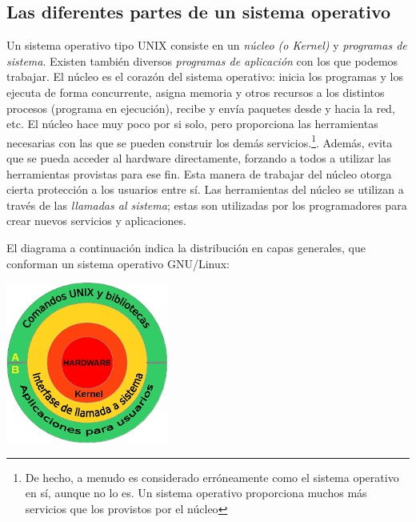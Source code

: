 \documentclass[12pt]{article}
\begin{document}
\subsection{Las diferentes partes de un sistema operativo}

Un sistema operativo tipo UNIX consiste en un \textit{núcleo (o Kernel)} 
y \textit{programas de sistema}. Existen también diversos 
\textit{programas de aplicación} con los que podemos trabajar.  El núcleo 
es el corazón del sistema operativo: inicia los programas y los ejecuta 
de forma concurrente, asigna memoria y otros recursos a los distintos 
procesos (programa en ejecución), recibe y envía paquetes desde y hacia 
la red, etc. El núcleo hace muy poco por si solo, pero proporciona las 
herramientas necesarias 
con las que se pueden construir los demás servicios.\footnote{De hecho, a 
menudo es considerado erróneamente como el sistema operativo en sí, 
aunque no lo es. Un sistema operativo proporciona muchos más
servicios que los provistos por el núcleo}.  
Además, evita que se pueda acceder al hardware directamente, forzando 
a todos a utilizar las herramientas provistas para ese fin. Esta
manera de trabajar del núcleo otorga cierta protección a los usuarios 
entre sí. Las herramientas del núcleo se utilizan a través de las 
\textit{llamadas al sistema}; estas son utilizadas por los programadores 
para crear nuevos servicios y aplicaciones.  

El diagrama a continuación indica la distribución en capas generales, 
que conforman un sistema operativo GNU/Linux: 

\begin{center}
\includegraphics{./img/esquemaOS_s.jpg}
\end{center}
\end{document}
